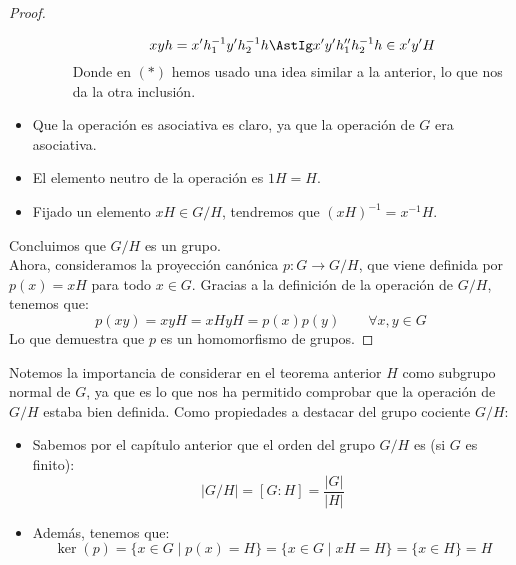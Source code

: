\begin{teo}
\begin{proof}
\begin{itemize}
\begin{description}
\begin{equation*}
                            xyh = x'h_1^{-1}y'h_2^{-1}h \AstIg x'y'h_1''h_2^{-1}h \in x'y'H
                        \end{equation*}
                        Donde en $(\ast)$ hemos usado una idea similar a la anterior, lo que nos da la otra inclusión.
                \end{description}
            \item Que la operación es asociativa es claro, ya que la operación de $G$ era asociativa.
            \item El elemento neutro de la operación es $1H = H$.
            \item Fijado un elemento $xH \in G/H$, tendremos que ${(xH)}^{-1} = x^{-1}H$.
        \end{itemize}
        Concluimos que $G/H$ es un grupo.\\

        \noindent
        Ahora, consideramos la proyección canónica $p:G\rightarrow G/H$, que viene definida por $p(x) = xH$ para todo $x\in G$. Gracias a la definición de la operación de $G/H$, tenemos que:
        \begin{equation*}
            p(xy) = xyH = xHyH = p(x)p(y) \qquad \forall x,y\in G
        \end{equation*}
        Lo que demuestra que $p$ es un homomorfismo de grupos.
    \end{proof}
\end{teo}

Notemos la importancia de considerar en el teorema anterior $H$ como subgrupo normal de $G$, ya que es lo que nos ha permitido comprobar que la operación de $G/H$ estaba bien definida. Como propiedades a destacar del grupo cociente $G/H$:

\begin{itemize}
    \item Sabemos por el capítulo anterior que el orden del grupo $G/H$ es (si $G$ es finito):
        \begin{equation*}
            |G/H| = [G:H] = \dfrac{|G|}{|H|}
        \end{equation*}
    \item Además, tenemos que: 
        \begin{equation*}
            \ker(p) = \{x\in G\mid p(x) = H\} = \{x\in G\mid xH = H\} = \{x\in H\} = H
        \end{equation*}
\end{itemize}

